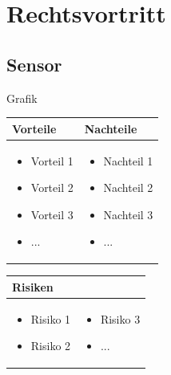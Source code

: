 
\section{Rechtsvortritt}


\subsection{Sensor}

Grafik

\begin{table}[h]
\begin{tabular}{p{} | p{}}


 \textbf{Vorteile} & \textbf{Nachteile} \\ \hline
	 
\begin{itemize}
\item Vorteil 1
\item Vorteil 2
\item Vorteil 3
\item ...
\end{itemize}

 
 &
 
\begin{itemize}
\item Nachteil 1
\item Nachteil 2
\item Nachteil 3
\item ...
\end{itemize}

\end{tabular}
\end{table}

\begin{table}[h]
\begin{tabular}{p{}p{}}


 \textbf{Risiken} & \\ \hline
	 
\begin{itemize}
\item Risiko 1
\item Risiko 2
\end{itemize}
&
\begin{itemize}
\item Risiko 3
\item ...
\end{itemize}

 
\end{tabular}
\end{table}

